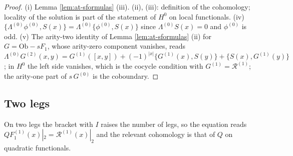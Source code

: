 \documentclass[11pt]{article}
\numberwithin{equation}{section}
\theoremstyle{plain}
\theoremstyle{definition}
\newcommand{\Ob}{\mathrm{Ob}}
\begin{document}
\begin{proof}
(i) Lemma \ref{lem:at-sformulas} (iii). (ii), (iii): definition of the cohomology; locality of the solution is part of the statement of $H^0$ on local functionals. (iv) $\{\Lambda^{(0)}\phi^{(0)},S(x)\}=\Lambda^{(0)}\{\phi^{(0)},S(x)\}$ since $\Lambda^{(0)}S(x)=0$ and $\phi^{(0)}$ is odd. (v) The arity-two identity of Lemma \ref{lem:at-sformulas} (ii) for $G=\Ob-sF_1$, whose arity-zero component vanishes, reads $\Lambda^{(0)}G^{(2)}(x,y)=G^{(1)}([x,y])+(-1)^{|x|}\{G^{(1)}(x),S(y)\}+\{S(x),G^{(1)}(y)\}$; in $H^0$ the left side vanishes, which is the cocycle condition with $G^{(1)}=\mathcal R^{(1)}$; the arity-one part of $s\,G^{(0)}$ is the coboundary.
\end{proof}

\subsection{Two legs}

On two legs the bracket with $I$ raises the number of legs, so the equation reads $QF_1^{(1)}(x)|_2=\mathcal R^{(1)}(x)|_2$ and the relevant cohomology is that of $Q$ on quadratic functionals.
\end{document}
